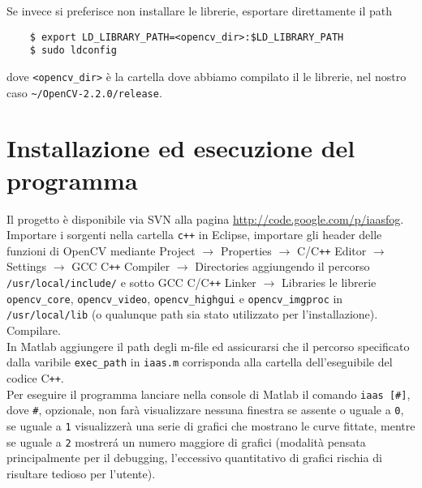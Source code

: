 \documentclass[12pt]{report}
\begin{document}
\noindent Se invece si preferisce non installare le librerie, esportare direttamente il path 

\begin{verbatim}
	$ export LD_LIBRARY_PATH=<opencv_dir>:$LD_LIBRARY_PATH
	$ sudo ldconfig
\end{verbatim}

\noindent dove \verb|<opencv_dir>| \`e la cartella dove abbiamo compilato il le librerie, nel nostro caso \verb|~/OpenCV-2.2.0/release|.

\section{Installazione ed esecuzione del programma}
\noindent Il progetto \`e disponibile via SVN alla pagina \url{http://code.google.com/p/iaasfog}.\\
Importare i sorgenti nella cartella \verb|c++| in Eclipse, importare gli header delle funzioni di OpenCV mediante Project $\rightarrow$ Properties  $\rightarrow$ C\slash C\verb|++| Editor $\rightarrow$ Settings $\rightarrow$ GCC C\verb|++| Compiler $\rightarrow$ Directories aggiungendo il percorso \verb|/usr/local/include/| e sotto GCC C\slash C\verb|++| Linker $\rightarrow$ Libraries le librerie \verb|opencv_core|, \verb|opencv_video|, \verb|opencv_highgui| e \verb|opencv_imgproc| in \verb|/usr/local/lib| (o qualunque path sia stato utilizzato per l'installazione).\\
Compilare.\\

\noindent In Matlab aggiungere il path degli m-file ed assicurarsi che il percorso specificato dalla varibile \verb|exec_path| in \verb|iaas.m| corrisponda alla cartella dell'eseguibile del codice C\verb|++|.\\
Per eseguire il programma lanciare nella console di Matlab il comando \verb|iaas [#]|, dove \verb|#|, opzionale, non far\`a visualizzare nessuna finestra se assente o uguale a \verb|0|, se uguale a \verb|1| visualizzer\`a una serie di grafici che mostrano le curve fittate, mentre se uguale a \verb|2| mostrer\'a un numero maggiore di grafici (modalit\`a pensata principalmente per il debugging, l'eccessivo quantitativo di grafici rischia di risultare tedioso per l'utente).

\printbibliography
\end{document}
